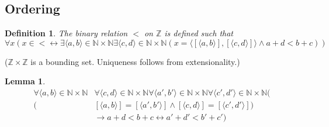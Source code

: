 \documentclass{report}
\newtheorem{lemma}[theo]{Lemma}
\newtheorem{definition}[theo]{Definition}
\begin{document}
\subsection{Ordering}
\begin{definition}
The binary relation $<$ on $\mathbb Z$ is defined such that
\begin{equation*}
\forall x(x\in<\leftrightarrow\exists\langle a,b\rangle\in\mathbb N\times\mathbb N\exists\langle c,d\rangle\in\mathbb N\times\mathbb N(x=\langle[\langle a,b\rangle],[\langle c,d\rangle]\rangle\land 
a+d<b+c))
\end{equation*}
\end{definition}
\noindent($\mathbb Z\times\mathbb Z$ is a bounding set. Uniqueness follows from extensionality.)
\begin{lemma}\label{Z_order_1}
\begin{align*}
\forall\langle a,b\rangle\in\mathbb N\times\mathbb N&\forall\langle c,d\rangle\in\mathbb N\times\mathbb N\forall\langle a',b'\rangle\in\mathbb N\times\mathbb N
\forall\langle c',d'\rangle\in\mathbb N\times\mathbb N(\\(&[\langle a,b\rangle]=[\langle a',b'\rangle]\land[\langle c,d\rangle]=
[\langle c',d'\rangle])\\
&\to a+d<b+c\leftrightarrow a'+d'<b'+c')
\end{align*}
\end{lemma}
\end{document}
